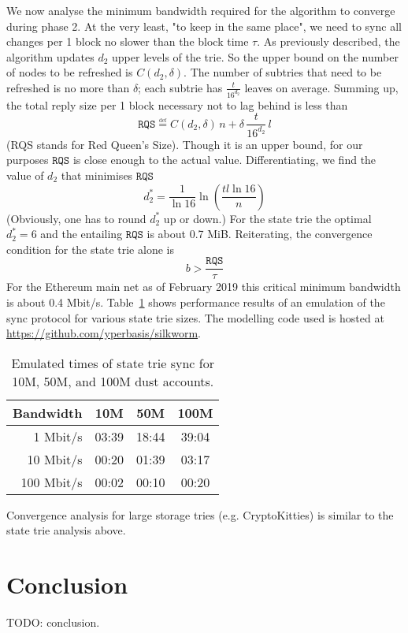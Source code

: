 \documentclass{amsart}
\begin{document}
We now analyse the minimum bandwidth required for the algorithm to converge during phase 2.
At the very least, "to keep in the same place",
we need to sync all changes per 1 block no slower than the block time $\tau$.
As previously described, the algorithm updates $d_2$ upper levels of the trie.
So the upper bound on the number of nodes to be refreshed is $C(d_2, \delta)$.
The number of subtries that need to be refreshed is no more than $\delta$;
each subtrie has $\frac{t}{16^{d_2}}$ leaves on average.
Summing up, the total reply size per 1 block necessary not to lag behind is less than
\begin{equation}
    \texttt{RQS} \overset{\underset{\mathrm{def}}{}}{=}
    C(d_2, \delta) \, n + \delta \, \frac{t}{16^{d_2}} \, l
\end{equation}
(RQS stands for Red Queen's Size).
Though it is an upper bound, for our purposes $\texttt{RQS}$ is close enough to the actual value.
Differentiating, we find the value of $d_2$ that minimises $\texttt{RQS}$
\begin{equation}
    d_2^* = \frac{1}{\ln 16} \ln \left( \frac{tl \ln16}{n} \right)
\end{equation}
(Obviously, one has to round $d_2^*$ up or down.)
For the state trie the optimal $d_2^* = 6$ and the entailing $\texttt{RQS}$ is about 0.7 MiB.
Reiterating, the convergence condition for the state trie alone is
\begin{equation}
    b > \frac{\texttt{RQS}}{\tau}
\end{equation}
For the Ethereum main net as of February 2019 this critical minimum bandwidth is about 0.4 Mbit/s.
Table~\ref{tab:emulated_time} shows performance results of an emulation of the sync protocol for various state trie sizes.
The modelling code used is hosted at \href{https://github.com/yperbasis/silkworm/blob/master/lab/sync_emulator.cpp}{https://github.com/yperbasis/silkworm}.

\begin{table}[h]
\begin{tabular}{ r | c c c }
    Bandwidth & 10M & 50M & 100M \\
    \hline
      1 Mbit/s & 03:39 & 18:44 & 39:04 \\
     10 Mbit/s & 00:20 & 01:39 & 03:17 \\
    100 Mbit/s & 00:02 & 00:10 & 00:20 \\
\end{tabular}
\caption{Emulated times of state trie sync for 10M, 50M, and 100M dust accounts.}
\label{tab:emulated_time}
\end{table}

Convergence analysis for large storage tries (e.g. CryptoKitties) is similar to the state trie analysis above.

\section{Conclusion}

TODO: conclusion.




\end{document}
